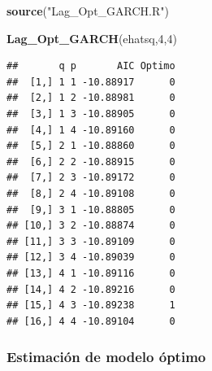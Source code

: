 \documentclass[
]{book}
\newenvironment{Shaded}{\begin{snugshade}}{\end{snugshade}}
\newcommand{\AttributeTok}[1]{\textcolor[rgb]{0.13,0.29,0.53}{#1}}
\newcommand{\DecValTok}[1]{\textcolor[rgb]{0.00,0.00,0.81}{#1}}
\newcommand{\FunctionTok}[1]{\textcolor[rgb]{0.13,0.29,0.53}{\textbf{#1}}}
\newcommand{\NormalTok}[1]{#1}
\newcommand{\OtherTok}[1]{\textcolor[rgb]{0.56,0.35,0.01}{#1}}
\newcommand{\SpecialCharTok}[1]{\textcolor[rgb]{0.81,0.36,0.00}{\textbf{#1}}}
\newcommand{\StringTok}[1]{\textcolor[rgb]{0.31,0.60,0.02}{#1}}
\begin{document}
\begin{Shaded}
\begin{Highlighting}[]
\FunctionTok{source}\NormalTok{(}\StringTok{"Lag\_Opt\_GARCH.R"}\NormalTok{)}

\FunctionTok{Lag\_Opt\_GARCH}\NormalTok{(ehatsq,}\DecValTok{4}\NormalTok{,}\DecValTok{4}\NormalTok{)}
\end{Highlighting}
\end{Shaded}

\begin{verbatim}
##       q p       AIC Optimo
##  [1,] 1 1 -10.88917      0
##  [2,] 1 2 -10.88981      0
##  [3,] 1 3 -10.88905      0
##  [4,] 1 4 -10.89160      0
##  [5,] 2 1 -10.88860      0
##  [6,] 2 2 -10.88915      0
##  [7,] 2 3 -10.89172      0
##  [8,] 2 4 -10.89108      0
##  [9,] 3 1 -10.88805      0
## [10,] 3 2 -10.88874      0
## [11,] 3 3 -10.89109      0
## [12,] 3 4 -10.89039      0
## [13,] 4 1 -10.89116      0
## [14,] 4 2 -10.89216      0
## [15,] 4 3 -10.89238      1
## [16,] 4 4 -10.89104      0
\end{verbatim}

\hypertarget{estimaciuxf3n-de-modelo-uxf3ptimo}{%
\subsubsection{Estimación de modelo óptimo}\label{estimaciuxf3n-de-modelo-uxf3ptimo}}

\begin{Shaded}
\end{Shaded}
\end{document}
